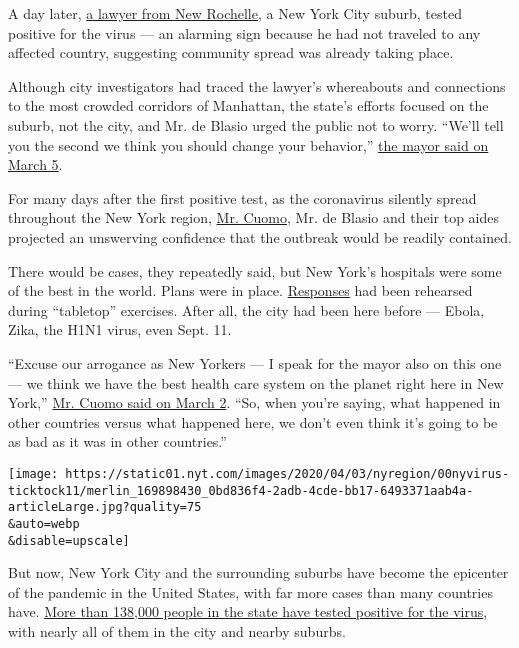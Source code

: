 A day later,
\href{https://www.nytimes.com/2020/03/03/nyregion/coronavirus-new-york-state.html}{a
lawyer from New Rochelle}, a New York City suburb, tested positive for
the virus --- an alarming sign because he had not traveled to any
affected country, suggesting community spread was already taking place.

Although city investigators had traced the lawyer's whereabouts and
connections to the most crowded corridors of Manhattan, the state's
efforts focused on the suburb, not the city, and Mr. de Blasio urged the
public not to worry. ``We'll tell you the second we think you should
change your behavior,''
\href{https://www.nytimes.com/2020/03/05/nyregion/coronavirus-new-york-cases.html}{the
mayor said on March 5}.

For many days after the first positive test, as the coronavirus silently
spread throughout the New York region,
\href{https://www.nytimes.com/2020/04/09/style/cuomo-ny-tough-video-coronavirus.html}{Mr.
Cuomo}, Mr. de Blasio and their top aides projected an unswerving
confidence that the outbreak would be readily contained.

There would be cases, they repeatedly said, but New York's hospitals
were some of the best in the world. Plans were in place.
\href{https://www.nytimes.com/2020/07/13/upshot/coronavirus-response-fax-machines.html}{Responses}
had been rehearsed during ``tabletop'' exercises. After all, the city
had been here before --- Ebola, Zika, the H1N1 virus, even Sept. 11.

``Excuse our arrogance as New Yorkers --- I speak for the mayor also on
this one --- we think we have the best health care system on the planet
right here in New York,''
\href{https://www.governor.ny.gov/news/video-audio-photos-rush-transcript-novel-coronavirus-briefing-governor-cuomo-announces-state}{Mr.
Cuomo said on March 2}. ``So, when you're saying, what happened in other
countries versus what happened here, we don't even think it's going to
be as bad as it was in other countries.''

\texttt{[image: https://static01.nyt.com/images/2020/04/03/nyregion/00nyvirus-ticktock11/merlin\_169898430\_0bd836f4-2adb-4cde-bb17-6493371aab4a-articleLarge.jpg?quality=75\\\&auto=webp\\\&disable=upscale]}

But now, New York City and the surrounding suburbs have become the
epicenter of the pandemic in the United States, with far more cases than
many countries have.
\href{https://www.nytimes.com/2020/04/07/nyregion/coronavirus-new-york-update.html}{More
than 138,000 people in the state have tested positive for the virus},
with nearly all of them in the city and nearby suburbs.

